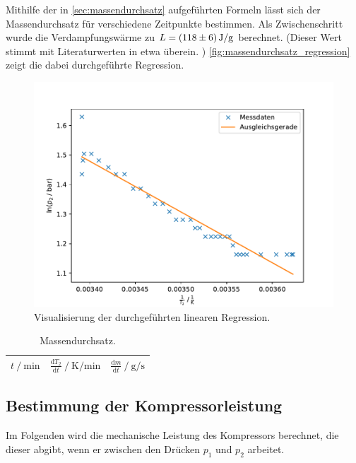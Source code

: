 Mithilfe der in \autoref{sec:massendurchsatz} aufgeführten Formeln
lässt sich der Massendurchsatz für verschiedene Zeitpunkte bestimmen.
Als Zwischenschritt wurde die Verdampfungswärme zu $L=\SI{118 \pm 6}{\joule\per\gram}$ berechnet.
(Dieser Wert stimmt mit Literaturwerten in etwa überein. \cite{verdampfungswaerme})
\autoref{fig:massendurchsatz_regression} zeigt die dabei durchgeführte Regression.

\begin{figure}
  \centering
  \includegraphics{build/plot_massendurchsatz.pdf}
  \caption{Visualisierung der durchgeführten linearen Regression.}
  \label{fig:massendurchsatz_regression}
\end{figure}

\begin{table}
\centering
\caption{Massendurchsatz.}
\begin{tabular}{c c c}
\toprule
$t \mathbin{/} \si{\minute}$ &
$\frac{\mathrm{d}T_2}{\mathrm{d}t} \mathbin{/} \si{\kelvin\per\minute}$ &
$\frac{\mathrm{d}m}{\mathrm{d}t} \mathbin{/} \si{\gram\per\second}$ \\
\midrule

\bottomrule
\end{tabular}
\end{table}

\FloatBarrier

\subsection{Bestimmung der Kompressorleistung} %
Im Folgenden wird die mechanische Leistung des Kompressors berechnet,
die dieser abgibt,
wenn er zwischen den Drücken $p_1$ und $p_2$ arbeitet.

